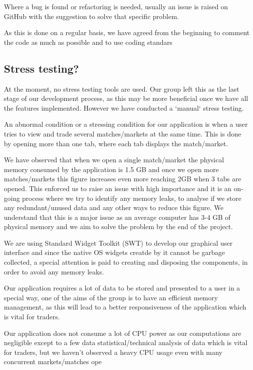 \documentclass[10pt]{article}
\begin{document}
Where a bug is found or refactoring is needed, usually an issue is raised on GitHub with the suggestion to solve that specific problem.

As this is done on a regular basis, we have agreed from the beginning to comment the code as much as possible and to use coding standars

\subsection{Stress testing?}

At the moment, no stress testing tools are used. Our group left this as the last stage of our development process, as this may be more beneficial once we have all the features implemented.
However we have conducted a `manual` stress testing.

An abnormal condition or a stressing condition for our application is when a user tries to view and trade several matches/markets at the same time. This is done by opening more than one tab, where each tab displays the match/market.

We have observed that when we open a single match/market the physical memory consumed by the application is 1.5 GB and once we open more matches/markets this figure increases even more reaching 2GB when 3 tabs are opened. This enforced us to raise an issue with high importance and it is an on-going process where we try to identify any memory leaks, to analyse if we store any redundant/unused data and any other ways to reduce this figure. We understand that this is a major issue as an average computer has 3-4 GB of physical memory and we aim to solve the problem by the end of the project.

We are using Standard Widget Toolkit (SWT) to develop our graphical user interface and since the native OS widgets creatde by it cannot be garbage collected, a special attention is paid to creating and disposing the components, in order to avoid any memory leaks.

Our application requires a lot of data to be stored and presented to a user in a special way, one of the aims of the group is to have an efficient memory management, as this will lead to a better responsiveness of the application which is vital for traders.

Our application does not consume a lot of CPU power as our computations are negligible except to a few data statistical/technical analysis of data which is vital for traders, but we haven’t observed a heavy CPU usage even with many concurrent markets/matches ope
\end{document}
